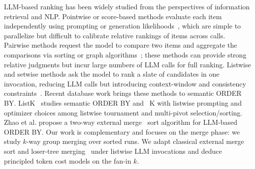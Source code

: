  LLM-based ranking has been widely studied from the perspectives of information retrieval and NLP.
Pointwise or score-based methods evaluate each item independently using prompting or generation likelihoods~\cite{DBLP:conf/emnlp/DrozdovZD0RWAIM23, DBLP:conf/emnlp/SachanLJAYPZ22}, which are simple to parallelize but difficult to calibrate relative rankings of items across calls. 
Pairwise methods request the model to compare two items and aggregate the comparisons via sorting or graph algorithms~\cite{DBLP:conf/acl/LuoCH024, DBLP:conf/naacl/QinJHZWYSLLMWB24}; these methods can provide strong relative judgments but incur large numbers of LLM calls for full ranking.
Listwise and setwise methods ask the model to rank a slate of candidates in one invocation, reducing LLM calls but introducing context-window and consistency constraints~\cite{DBLP:conf/sigir/ZhuangZKZ24, DBLP:conf/emnlp/0001YMWRCYR23, DBLP:journals/corr/abs-2603-17223, DBLP:journals/corr/abs-2305-02156}. Recent database work brings these methods to semantic \textsf{ORDER BY}.
ListK~\cite{DBLP:journals/corr/abs-2603-17223} studies semantic \textsf{ORDER BY} and \LIMIT~K with listwise prompting and optimizer choices among listwise tournament and multi-pivot selection/sorting. 
Zhao et al. propose a two-way external merge~\cite{DBLP:journals/corr/abs-2509-00303} sort algorithm for LLM-based \textsf{ORDER BY}.  Our work is complementary and focuses on the merge phase: we study $k$-way group merging over sorted runs. We adapt classical external merge sort and loser-tree merging~\cite{DBLP:journals/csur/Graefe06} under listwise LLM invocations and deduce principled token cost models on the fan-in $k$. 